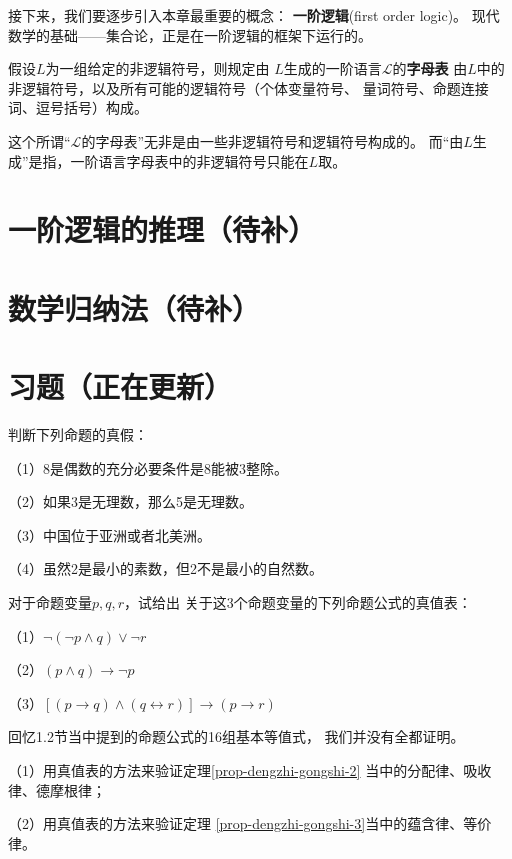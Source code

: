 接下来，我们要逐步引入本章最重要的概念：
\textbf{一阶逻辑}(first order logic)。
现代数学的基础——集合论，正是在一阶逻辑的框架下运行的。

\begin{definition}[一阶逻辑的字母表]
假设$L$为一组给定的非逻辑符号，则规定由
$L$生成的一阶语言$\mathcal{L}$的\textbf{字母表}
由$L$中的非逻辑符号，以及所有可能的逻辑符号（个体变量符号、
量词符号、命题连接词、逗号括号）构成。
\end{definition}

这个所谓“$\mathcal{L}$的字母表”无非是由一些非逻辑符号和逻辑符号构成的。
而“由$L$生成”是指，一阶语言字母表中的非逻辑符号只能在$L$取。






\section{一阶逻辑的推理（待补）}
\section{数学归纳法（待补）}
\section{习题（正在更新）}

\begin{prob}判断下列命题的真假：

（1）8是偶数的充分必要条件是8能被$3$整除。

（2）如果3是无理数，那么5是无理数。

（3）中国位于亚洲或者北美洲。

（4）虽然2是最小的素数，但2不是最小的自然数。

\end{prob}\vs

\begin{prob}对于命题变量$p,q,r$，试给出
关于这3个命题变量的下列命题公式的真值表：

（1）$\neg(\neg p\wedge q)\vee\neg r$

（2）$(p\wedge q)\rightarrow\neg p$

（3）$[(p\rightarrow q)\wedge(q\leftrightarrow r)]
\rightarrow(p\rightarrow r)$
\end{prob}\vs

\begin{prob}[基本等值公式的验证]
回忆1.2节当中提到的命题公式的16组基本等值式，
我们并没有全都证明。

（1）用真值表的方法来验证定理\ref{prop-dengzhi-gongshi-2}
当中的分配律、吸收律、德摩根律；

（2）用真值表的方法来验证定理
\ref{prop-dengzhi-gongshi-3}当中的蕴含律、等价律。
\end{prob}\vs

